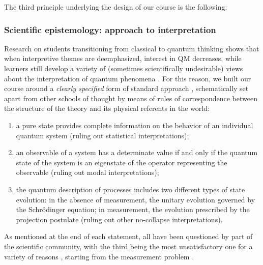 \documentclass[twocolumn,secnumarabic,amssymb, nobibnotes, aps, prd, nofootinbib]{revtex4-2}
\begin{document}
The third principle underlying the design of our course is the following:\\

\centerline{}



\subsubsection{Scientific epistemology: approach to interpretation} \label{Sec:2.2.2}
Research on students transitioning from classical to quantum thinking shows that when interpretive themes are deemphasized, interest in QM decreases, while learners still develop a variety of (sometimes scientifically undesirable) views about the interpretation of quantum phenomena \cite{Baily2015}. For this reason, we built our course around a \emph{clearly specified} form of standard approach \cite{Bub1997}, schematically set apart from other schools of thought by means of rules of correspondence between the structure of the theory and its physical referents in the world:
\begin{enumerate}
    \item a pure state provides complete information on the behavior of an individual quantum system (ruling out statistical interpretations);
    \item an observable of a system has a determinate value if and only if the quantum state of the system is an eigenstate of the operator representing the observable (ruling out modal interpretations);
    \item the quantum description of processes includes two different types of state evolution: in the absence of measurement, the unitary evolution governed by the Schr\"{o}dinger equation; in measurement, the evolution prescribed by the projection postulate (ruling out other no-collapse interpretations).
\end{enumerate}
As mentioned at the end of each statement, all have been questioned by part of the scientific community, with the third being the most unsatisfactory one for a variety of reasons \cite{Bub1997}, starting from the measurement problem \cite{Schlosshauer2007}.
\end{document}
